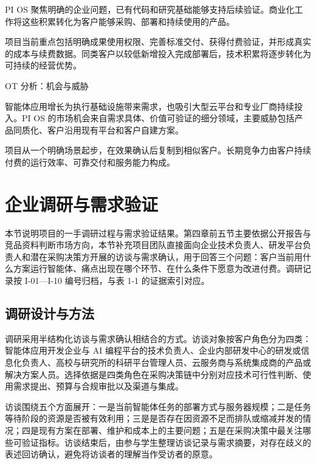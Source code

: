 PI OS 聚焦明确的企业问题，已有代码和研究基础能够支持后续验证。商业化工作将这些积累转化为客户能够采购、部署和持续使用的产品。

项目当前重点包括明确成果使用权限、完善标准交付、获得付费验证，并形成真实的成本与续费数据。同类客户以较低新增投入完成部署后，技术积累将逐步转化为可持续的经营优势。

OT 分析：机会与威胁

智能体应用增长为执行基础设施带来需求，也吸引大型云平台和专业厂商持续投入。PI OS 的市场机会来自需求具体、价值可验证的细分领域，主要威胁包括产品同质化、客户沿用现有平台和客户自建方案。

项目从一个明确场景起步，在效果确认后复制到相似客户。长期竞争力由客户持续付费的运行效率、可靠交付和服务能力构成。

\section{企业调研与需求验证}\label{sec:4.6}
本节说明项目的一手调研过程与需求验证结果。第四章前五节主要依据公开报告与竞品资料判断市场方向，本节补充项目团队直接面向企业技术负责人、研发平台负责人和潜在采购决策方开展的访谈与需求确认，用于回答三个问题：客户当前用什么方案运行智能体、痛点出现在哪个环节、在什么条件下愿意为改进付费。调研记录按 I-01---I-10 编号归档，与表 1-1 的证据索引对应。

\par{}

\subsection{调研设计与方法}\label{sec:4.6.1}
调研采用半结构化访谈与需求确认相结合的方式。访谈对象按客户角色分为四类：智能体应用开发企业与 AI 编程平台的技术负责人、企业内部研发中心的研发或信息化负责人、高校与研究所的科研平台管理人员、云服务商与系统集成商的产品或解决方案人员。选择依据是四类角色在采购决策链中分别对应技术可行性判断、使用需求提出、预算与合规审批以及渠道与集成。

访谈围绕五个方面展开：一是当前智能体任务的部署方式与服务器规模；二是任务等待阶段的资源是否被有效利用；三是是否存在因资源不足而排队或缩减并发的情况；四是现有方案在部署、维护和成本上的主要问题；五是在采购决策中最关注哪些可验证指标。访谈结束后，由参与学生整理访谈记录与需求摘要，对存在歧义的表述回访确认，避免将访谈者的理解当作受访者的原意。

